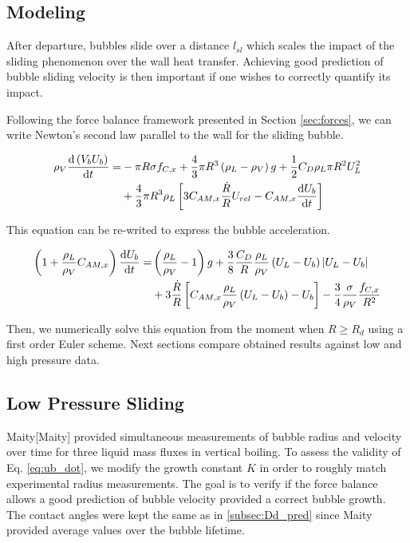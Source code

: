 \subsection{Modeling}

After departure, bubbles slide over a distance $l_{sl}$ which scales the impact of the sliding phenomenon over the wall heat transfer. Achieving good prediction of bubble sliding velocity is then important if one wishes to correctly quantify its impact. 

Following the force balance framework presented in Section \ref{sec:forces}, we can write Newton's second law parallel to the wall for the sliding bubble.


\begin{align}
\nonumber \rho_{V}\derive{\parth{V_{b}U_{b}}}{t} =& - \pi R\sigma f_{C,x}+ \frac{4}{3}\pi R^{3}\parth{\rho_{L}-\rho_{V}}g + \frac{1}{2}C_{D}\rho_{L}\pi R^{2} U_{L}^{2} \\
%
&+ \frac{4}{3}\pi R^{3}\rho_{L}\crocht{3C_{AM,x}\frac{\dot{R}}{R}U_{rel} - C_{AM,x}\derive{U_{b}}{t}}
\end{align}

This equation can be re-writed to express the bubble acceleration.

\begin{align}
\nonumber \parth{1+\frac{\rho_{L}}{\rho_{V}}C_{AM,x}}\derive{U_{b}}{t} = & \parth{\frac{\rho_{L}}{\rho_{V}}-1}g + \frac{3}{8}\frac{C_{D}}{R}\frac{\rho_{L}}{\rho_{V}}\parth{U_{L}-U_{b}}\bars{U_{L}-U_{b}} \\
%
&+ 3\frac{\dot{R}}{R}\crocht{C_{AM,x}\frac{\rho_{L}}{\rho_{V}}\parth{U_{L}-U_{b}}-U_{b}} - \frac{3}{4}\frac{\sigma}{\rho_{V}}\frac{f_{C,x}}{R^{2}}
\label{eq:ub_dot}
\end{align}

Then, we numerically solve this equation from the moment when $R\geq R_{d}$ using a first order Euler scheme. Next sections compare obtained results against low and high pressure data.


\subsection{Low Pressure Sliding}

Maity[Maity] provided simultaneous measurements of bubble radius and velocity over time for three liquid mass fluxes in vertical boiling. To assess the validity of Eq. \ref{eq:ub_dot}, we modify the growth constant $K$ in order to roughly match experimental radius measurements. The goal is to verify if the force balance allows a good prediction of bubble velocity provided a correct bubble growth. The contact angles were kept the same as in \ref{subsec:Dd_pred} since Maity provided average values over the bubble lifetime.

